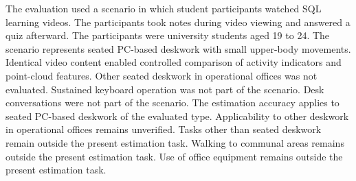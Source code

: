 The evaluation used a scenario in which student participants watched SQL learning videos.
  The participants took notes during video viewing and answered a quiz afterward.
  The participants were university students aged 19 to 24.
The scenario represents seated PC-based deskwork with small upper-body movements.
  Identical video content enabled controlled comparison of activity indicators and point-cloud features.
Other seated deskwork in operational offices was not evaluated.
  Sustained keyboard operation was not part of the scenario.
  Desk conversations were not part of the scenario.
The estimation accuracy applies to seated PC-based deskwork of the evaluated type.
  Applicability to other deskwork in operational offices remains unverified.
Tasks other than seated deskwork remain outside the present estimation task.
  Walking to communal areas remains outside the present estimation task.
  Use of office equipment remains outside the present estimation task.